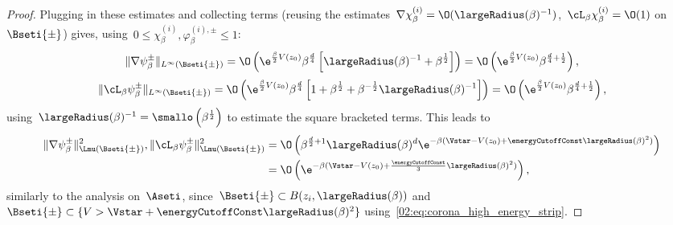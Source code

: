 \begin{proof}
            Plugging in these estimates and collecting terms (reusing the estimates~$\nabla\chi_\beta^{(i)}=\O(\largeRadius(\beta)^{-1})$,~$\cL_\beta\chi_\beta^{(i)}=\O(1)$ on~$\Bseti{\pm}$) gives, using~$0\leq \chi_\beta^{(i)},\varphi_\beta^{(i),\pm}\leq 1$:
            \[\|\nabla\psi_\beta^{\pm}\|_{L^\infty(\Bseti{\pm})}=\O\left(\e^{\frac\beta2 V(z_0)}\beta^{\frac d4}\left[\largeRadius(\beta)^{-1}+\beta^{\frac12}\right]\right)=\O\left(\e^{\frac\beta2 V(z_0)}\beta^{\frac d4+\frac12}\right),\]
            \[\|\cL_\beta \psi_\beta^{\pm}\|_{L^\infty(\Bseti{\pm})} = \O\left(\e^{\frac\beta2 V(z_0)}\beta^{\frac d4}\left[1+\beta^{\frac12}+\beta^{-\frac12}\largeRadius(\beta)^{-1}\right]\right)=\O\left(\e^{\frac\beta2 V(z_0)}\beta^{\frac d4+\frac12}\right),\]
            using~$\largeRadius(\beta)^{-1}=\smallo\left(\beta^{\frac12}\right)$ to estimate the square bracketed terms. This leads to
            \[\begin{split}\|\nabla\psi_\beta^{\pm}\|^2_{\Lmu(\Bseti{\pm})},\|\cL_\beta \psi_\beta^{\pm}\|^2_{\Lmu(\Bseti{\pm})} &= \O\left(\beta^{\frac d2+1}\largeRadius(\beta)^d\e^{-\beta(\Vstar-V(z_0)+\energyCutoffConst\largeRadius(\beta)^2)}\right)\\
                &=\O\left(\e^{-\beta(\Vstar-V(z_0)+\frac\energyCutoffConst3\largeRadius(\beta)^2)}\right),\end{split}\]
            similarly to the analysis on~$\Aseti$, since~$\Bseti{\pm} \subset B(z_i,\largeRadius(\beta))$ and~$\Bseti{\pm}\subset \{V>\Vstar+\energyCutoffConst\largeRadius(\beta)^2\}$ using~\eqref{02:eq:corona_high_energy_strip}.


\end{proof}
